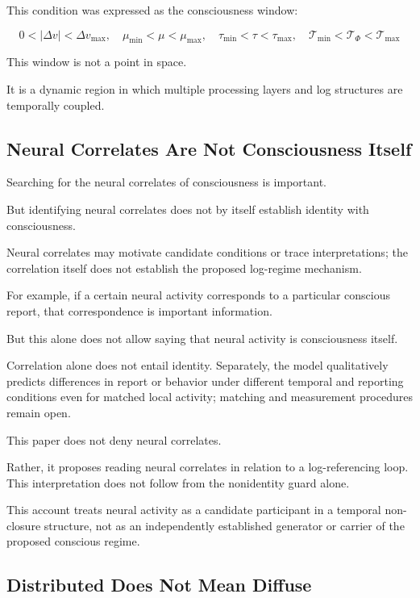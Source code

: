 This condition was expressed as the consciousness window:

\begin{equation}
0 < |\Delta v| < \Delta v_{\max}, \quad \mu_{\min} < \mu < \mu_{\max}, \quad \tau_{\min} < \tau < \tau_{\max}, \quad \mathcal{T}_{\min} < \mathcal{T}_{\Phi} < \mathcal{T}_{\max}
\end{equation}

This window is not a point in space.

It is a dynamic region in which multiple processing layers and log structures are temporally coupled.

\subsection{Neural Correlates Are Not Consciousness Itself}


Searching for the neural correlates of consciousness is important.

But identifying neural correlates does not by itself establish identity with consciousness.

Neural correlates may motivate candidate conditions or trace interpretations; the correlation itself does not establish the proposed log-regime mechanism.

For example, if a certain neural activity corresponds to a particular conscious report, that correspondence is important information.

But this alone does not allow saying that neural activity is consciousness itself.

Correlation alone does not entail identity. Separately, the model qualitatively predicts differences in report or behavior under different temporal and reporting conditions even for matched local activity; matching and measurement procedures remain open.

This paper does not deny neural correlates.

Rather, it proposes reading neural correlates in relation to a log-referencing loop. This interpretation does not follow from the nonidentity guard alone.

This account treats neural activity as a candidate participant in a temporal non-closure structure, not as an independently established generator or carrier of the proposed conscious regime.

\subsection{Distributed Does Not Mean Diffuse}



